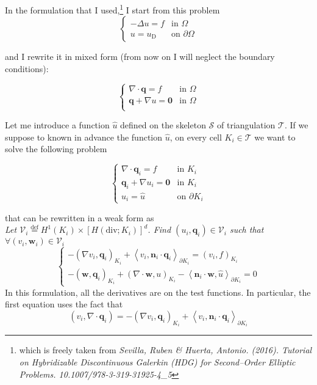\documentclass[a4paper,12pt, draft]{article}
\newcommand{\Def}{\stackrel{\mathrm{def}}{=}}
\newcommand{\diver}[1]{\ensuremath{\nabla \cdot #1}}
\newcommand{\uu}{u}
\newcommand{\q}{\mathbf{q}}
\newcommand{\skeleton}{\mathcal{S}}
\newcommand{\triangulation}{\mathcal{T}}
\begin{document}
In the formulation that I used,\footnote{
  which is freely taken from { \it Sevilla, Ruben \& Huerta, Antonio. (2016). Tutorial on
Hybridizable   Discontinuous Galerkin (HDG) for Second--Order Elliptic Problems.
10.1007/978-3-319-31925-4\_5}
}
I start from this problem
\[
   \begin{cases}
      - \Delta \uu = f         & \mbox{in } \Omega \\
      \uu = \uu_{\mathrm{D}}     & \mbox{on } \partial \Omega
   \end{cases}
\]

and I rewrite it in mixed form (from now on I will neglect the boundary conditions):

  \[
    \begin{cases}
      \diver{\q} = f                 & \mbox{in } \Omega \\
      \q + \nabla \uu = \mathbf{0}    & \mbox{in } \Omega \\
    \end{cases}
  \]

Let me introduce a function $\hat{\uu}$ defined on the skeleton $\skeleton$ of
triangulation $\mathcal{T}$. If we suppose to known in advance the function $\hat{\uu}$, on every
cell $K_i \in \triangulation$ we want to solve the following problem

      \[
      \begin{cases}
       \diver{\q}_i = f                  & \mbox{in } K_i  \\
       \q_i + \nabla \uu_i = \mathbf{0}     & \mbox{in } K_i \\
       \uu_i = \hat{\uu}           & \mbox{on } \partial K_i
      \end{cases}
    \]

that can be rewritten in a weak form as \\
{  \it Let $\mathcal{V}_i \Def H^1(K_i) \times \left[H(\mathrm{div}; K_i)\right]^d$. Find $(\uu_i,
    \q_i) \in \mathcal{V}_i$ such that $\forall (v_i, \mathbf{w}_i) \in \mathcal{V}_i$ }
  \[
   \begin{cases}
      -\left(\nabla v_i, \q_i\right)_{K_i} + \left<v_i, \mathbf{n}_i \cdot
          \q_i\right>_{\partial K_i} = \left(v_i, f\right)_{K_i} \\
      -\left(\mathbf{w}, \q_i\right)_{K_i} \! + \left(\diver{\mathbf{w}},\uu
          \right)_{K_i} \! -  \left<\mathbf{n}_i \cdot \mathbf{w}, \hat{\uu}
          \right>_{\partial K_i} = 0
    \end{cases}
  \]
In this formulation, all the derivatives are on the test functions. In particular, the first
equation uses the fact that
\[ \left(v_i, \diver{\q_i} \right) = -\left(\nabla v_i, \q_i\right)_{K_i} + \left<v_i, \mathbf{n}_i
    \cdot \q_i\right>_{\partial K_i}  \]
\end{document}
